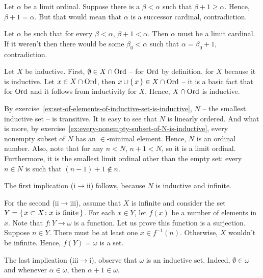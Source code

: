 \documentclass[12pt]{article}
\theoremstyle{definition}
\newenvironment{customthm}[1]
  {\renewcommand\theinnercustomthm{#1}\innercustomthm}
  {\endinnercustomthm}
\begin{document}
\begin{customthm}{I.2.2}
    Let $\alpha$ be a limit ordinal. Suppose there is a $\beta < \alpha$ such that $\beta+1 \geq \alpha$. Hence, $\beta + 1 = \alpha$. But that would mean that $\alpha$ is a successor cardinal, contradiction.
    
    Let $\alpha$ be such that for every $\beta < \alpha$, $\beta + 1 < \alpha$. Then $\alpha$ must be a limit cardinal. If it weren't then there would be some $\beta_0 < \alpha$ such that $\alpha = \beta_0 + 1$, contradiction.
\end{customthm}

\begin{customthm}{I.2.3}
    Let $X$ be inductive. First, $\emptyset \in X \cap \mathord{{\rm Ord}}$ -- for $\mathord{{\rm Ord}}$ by definition. for $X$ because it is inductive. Let $x \in X \cap \mathord{{\rm Ord}}$, then $x \cup \{\,{x}\,\} \in X \cap \mathord{{\rm Ord}}$ -- it is a basic fact that for $\mathord{{\rm Ord}}$ and it follows from inductivity for $X$. Hence, $X \cap \mathord{{\rm Ord}}$ is inductive.
    
    By exercise~\ref{ex:set-of-elements-of-inductive-set-is-inductive}, $N$ -- the smallest inductive set -- is transitive. It is easy to see that $N$ is linearly ordered. And what is more, by exercise~\ref{ex:every-nonempty-subset-of-N-is-inductive}, every nonempty subset of $N$ has an $\in$-minimal element. Hence, $N$ is an ordinal number. Also, note that for any $n<N$, $n+1<N$, so it is a limit ordinal. Furthermore, it is the smallest limit ordinal other than the empty set: every $n \in N$ is such that $(n-1) + 1 \not\in n$.
\end{customthm}

\begin{customthm}{I.2.4}
    The first implication (i$\to$ii) follows, because $N$ is inductive and infinite.
    
    For the second (ii$\to$iii), assume that $X$ is infinite and consider the set $Y = \{\,{x \subset X \colon x \text{ is finite}}\,\}$. For each $x \in Y$, let $f(x)$ be a number of elements in $x$. Note that $f \colon Y \to \omega$ is a function. Let us prove this function is a surjection. Suppose $n \in Y$. There must be at least one $x \in f^{-1}(n)$. Otherwise, $X$ wouldn't be infinite. Hence, $f(Y) = \omega$ is a set.
    
    The last implication (iii$\to$i), observe that $\omega$ is an inductive set. Indeed, $\emptyset \in \omega$ and whenever $\alpha \in \omega$, then $\alpha+1 \in \omega$.
\end{customthm}
\end{document}
